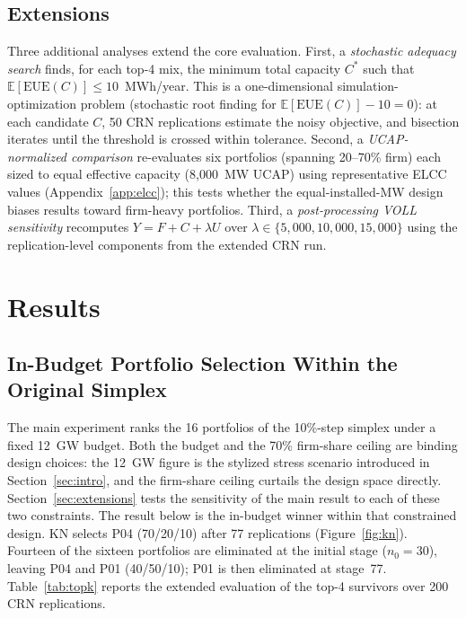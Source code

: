 \documentclass[11pt]{article}
\begin{document}
\subsection{Extensions}

Three additional analyses extend the core evaluation. First, a \textit{stochastic adequacy search} finds, for each top-4 mix, the minimum total capacity $C^*$ such that $\mathbb{E}[\text{EUE}(C)] \leq 10$~MWh/year. This is a one-dimensional simulation-optimization problem (stochastic root finding for $\mathbb{E}[\text{EUE}(C)] - 10 = 0$): at each candidate $C$, 50 CRN replications estimate the noisy objective, and bisection iterates until the threshold is crossed within tolerance. Second, a \textit{UCAP-normalized comparison} re-evaluates six portfolios (spanning 20--70\% firm) each sized to equal effective capacity (8,000~MW UCAP) using representative ELCC values (Appendix~\ref{app:elcc}); this tests whether the equal-installed-MW design biases results toward firm-heavy portfolios. Third, a \textit{post-processing VOLL sensitivity} recomputes $Y = F + C + \lambda U$ over $\lambda \in \{5{,}000, 10{,}000, 15{,}000\}$ using the replication-level components from the extended CRN run.

\section{Results}\label{sec:results}

\subsection{In-Budget Portfolio Selection Within the Original Simplex}

The main experiment ranks the 16 portfolios of the 10\%-step simplex under a fixed 12~GW budget. Both the budget and the 70\% firm-share ceiling are binding design choices: the 12~GW figure is the stylized stress scenario introduced in Section~\ref{sec:intro}, and the firm-share ceiling curtails the design space directly. Section~\ref{sec:extensions} tests the sensitivity of the main result to each of these two constraints. The result below is the in-budget winner within that constrained design. KN selects P04 (70/20/10) after 77 replications (Figure~\ref{fig:kn}). Fourteen of the sixteen portfolios are eliminated at the initial stage ($n_0 = 30$), leaving P04 and P01 (40/50/10); P01 is then eliminated at stage~77. Table~\ref{tab:topk} reports the extended evaluation of the top-4 survivors over 200 CRN replications.
\end{document}
